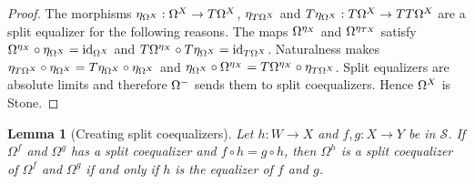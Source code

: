 \documentclass[sort&compress]{elsarticle}
\theoremstyle{plain}
\newtheorem{lemma}[theorem]{Lemma}
\theoremstyle{definition}
\theoremstyle{remark}
\newcommand\cat\mathcal
\begin{document}
\begin{proof} The morphisms $\eta_{\Omega^{X}}:\Omega^ X\to T\Omega^ X$, $\eta_{T \Omega^ X}$ and $T\eta_{\Omega^ X}:T\Omega^ X \to TT\Omega^ X$ are a split equalizer for the following reasons. The maps $\Omega^{\eta_ X}$ and $\Omega^{\eta_{TX}}$ satisfy $\Omega^{\eta_ X}\circ \eta_{\Omega^ X} = \mathrm{id}_{\Omega^ X}$ and $T\Omega^{\eta_{X}}\circ T\eta_{\Omega^{X}} = \mathrm{id}_{T\Omega^ X}$. Naturalness makes $\eta_{T \Omega^ X}\circ \eta_{\Omega^{X}} = T\eta_{\Omega^ X}\circ\eta_{\Omega^{X}}$ and $\eta_{\Omega^ X}\circ \Omega^{\eta_ X} = T\Omega^{\eta_ X}\circ \eta_{T\Omega^ X}$. Split equalizers are absolute limits and therefore $\Omega^-$ sends them to split coequalizers. Hence $\Omega^ X$ is Stone.
\end{proof}


\begin{lemma}[Creating split coequalizers] Let $h:W\to X$ and $f,g:X\to Y$ be in $\cat S$. If $\Omega^f$ and $\Omega^g$ has a split coequalizer and $f\circ h = g\circ h$, then $\Omega^h$ is a split coequalizer of $\Omega^f$ and $\Omega^g$ if and only if $h$ is the equalizer of $f$ and $g$. \end{lemma}
\end{document}
